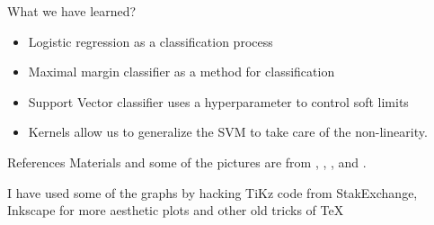 \documentclass{beamer}
\begin{document}
\begin{frame}{What we have learned?	}
\begin{itemize}
	\item Logistic regression as a classification process
	\item Maximal margin classifier as a method for classification
	\item Support Vector classifier uses a hyperparameter to control soft limits
	\item Kernels allow us to generalize the SVM to take care of the non-linearity.
\end{itemize}
\end{frame}

\begin{frame}{References}
	Materials and some of the pictures are from \citep{James2015}, \citep{hastie01}, \citep{geron2}, \citep{maindonald} and \citep{pestman}.
	\printbibliography 	
	
	I have used some of the graphs by hacking TiKz code from StakExchange, Inkscape for more aesthetic plots and other old tricks of \TeX
	
\end{frame}
\end{document}
